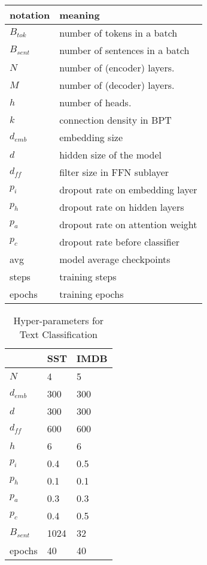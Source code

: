 \documentclass[11pt,a4paper]{article}
\begin{document}
\begin{table}[!htb]
\begin{tabular}{ll}
\toprule
notation & meaning                                          \\
\midrule
$B_{tok}$          & number of tokens in a batch                      \\
$B_{sent}$   & number of sentences in a batch \\
$N$          & number of (encoder) layers.                  \\
$M$          & number of (decoder) layers.                  \\
$h$          & number of heads.                                 \\
$k$          & connection density in BPT                        \\
$d_{emb}$    & embedding size                                   \\
$d$          & hidden size of the model                         \\
$d_{ff}$     & filter size in FFN sublayer                      \\
$p_i$        & dropout rate on embedding layer                  \\
$p_h$        & dropout rate on hidden layers                    \\
$p_a$        & dropout rate on attention weight                 \\
$p_c$        & dropout rate before classifier \\
avg          & model average checkpoints              \\
steps & training steps                           \\
epochs & training epochs \\
\bottomrule
\end{tabular}
\end{table}

\begin{table}[!htb]
\centering
\begin{tabular}{lll}
\toprule
          & SST & IMDB \\
\midrule
$N$       & 4   & 5    \\
$d_{emb}$ & 300 & 300  \\
$d$       & 300 & 300  \\
$d_{ff}$  & 600 & 600  \\
$h$       & 6   & 6    \\
$p_i$     & 0.4 & 0.5  \\
$p_h$     & 0.1 & 0.1  \\
$p_a$     & 0.3 & 0.3  \\
$p_c$     & 0.4 & 0.5  \\
$B_{sent}$       & 1024 & 32  \\
epochs    & 40  & 40   \\
\bottomrule
\end{tabular}
\caption{Hyper-parameters for Text Classification}
\label{tbl:hyper-tc}
\end{table}
\end{document}
